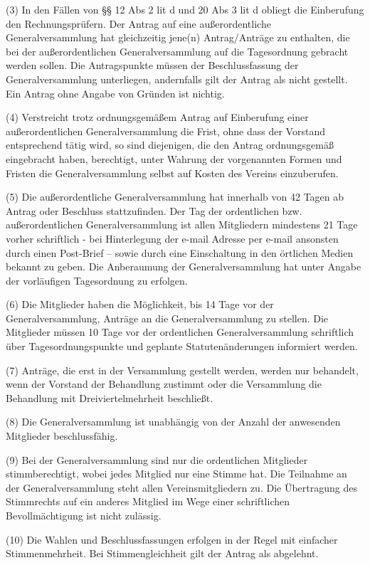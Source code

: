 \documentclass[10pt,a4paper]{article}
\begin{document}
(3)
In den Fällen von §§ 12 Abs 2 lit d und 20 Abs 3 lit d obliegt die Einberufung den Rechnungsprüfern.
Der Antrag auf eine außerordentliche Generalversammlung hat gleichzeitig jene(n) Antrag/Anträge zu enthalten, die bei der außerordentlichen Generalversammlung auf die Tagesordnung gebracht werden sollen.
Die Antragspunkte müssen der Beschlussfassung der Generalversammlung unterliegen, andernfalls gilt der Antrag als nicht gestellt.
Ein Antrag ohne Angabe von Gründen ist nichtig.

(4)
Verstreicht trotz ordnungsgemäßem Antrag auf Einberufung einer außerordentlichen Generalversammlung die Frist, ohne dass der Vorstand entsprechend tätig wird, so sind diejenigen, die den Antrag ordnungsgemäß eingebracht haben, berechtigt, unter Wahrung der vorgenannten Formen und Fristen die Generalversammlung selbst auf Kosten des Vereins einzuberufen.

(5)
Die außerordentliche Generalversammlung hat innerhalb von 42 Tagen ab Antrag oder Beschluss stattzufinden.
Der Tag der ordentlichen bzw. außerordentlichen Generalversammlung ist allen Mitgliedern mindestens 21 Tage vorher schriftlich - bei Hinterlegung der e-mail Adresse per e-mail ansonsten durch einen Post-Brief – sowie durch eine Einschaltung in den örtlichen Medien bekannt zu geben.
Die Anberaumung der Generalversammlung hat unter Angabe der vorläufigen Tagesordnung zu erfolgen.

(6)
Die Mitglieder haben die Möglichkeit, bis 14 Tage vor der Generalversammlung, Anträge an die Generalversammlung zu stellen.
Die Mitglieder müssen 10 Tage vor der ordentlichen Generalversammlung schriftlich über Tagesordnungspunkte und geplante Statutenänderungen informiert werden.

(7)
Anträge, die erst in der Versammlung gestellt werden, werden nur behandelt, wenn der Vorstand der Behandlung zustimmt oder die Versammlung die Behandlung mit Dreiviertelmehrheit beschließt.

(8)
Die Generalversammlung ist unabhängig von der Anzahl der anwesenden Mitglieder beschlussfähig.

(9)
Bei der Generalversammlung sind nur die ordentlichen Mitglieder stimmberechtigt, wobei jedes Mitglied nur eine Stimme hat.
Die Teilnahme an der Generalversammlung steht allen Vereinsmitgliedern zu.
Die Übertragung des Stimmrechts auf ein anderes Mitglied im Wege einer schriftlichen Bevollmächtigung ist nicht zulässig.

(10)
Die Wahlen und Beschlussfassungen erfolgen in der Regel mit einfacher Stimmenmehrheit.
Bei Stimmengleichheit gilt der Antrag als abgelehnt.
\end{document}
